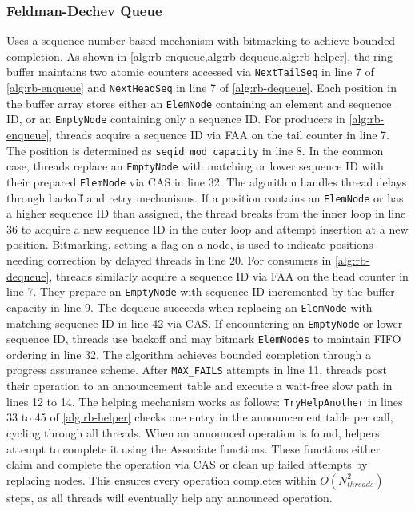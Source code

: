 \subsubsection{Feldman-Dechev Queue} 
Uses a sequence number-based mechanism with bitmarking to achieve bounded completion. As shown in \cref{alg:rb-enqueue,alg:rb-dequeue,alg:rb-helper}, the ring buffer maintains two atomic counters accessed via \texttt{NextTailSeq} in line 7 of \cref{alg:rb-enqueue} and \texttt{NextHeadSeq} in line 7 of \cref{alg:rb-dequeue}. Each position in the buffer array stores either an \texttt{ElemNode} containing an element and sequence ID, or an \texttt{EmptyNode} containing only a sequence ID. For producers in \cref{alg:rb-enqueue}, threads acquire a sequence ID via \ac{FAA} on the tail counter in line 7. The position is determined as \texttt{seqid mod capacity} in line 8. In the common case, threads replace an \texttt{EmptyNode} with matching or lower sequence ID with their prepared \texttt{ElemNode} via \ac{CAS} in line 32. The algorithm handles thread delays through backoff and retry mechanisms. If a position contains an \texttt{ElemNode} or has a higher sequence ID than assigned, the thread breaks from the inner loop in line 36 to acquire a new sequence ID in the outer loop and attempt insertion at a new position. Bitmarking, setting a flag on a node, is used to indicate positions needing correction by delayed threads in line 20. For consumers in \cref{alg:rb-dequeue}, threads similarly acquire a sequence ID via \ac{FAA} on the head counter in line 7. They prepare an \texttt{EmptyNode} with sequence ID incremented by the buffer capacity in line 9. The dequeue succeeds when replacing an \texttt{ElemNode} with matching sequence ID in line 42 via \ac{CAS}. If encountering an \texttt{EmptyNode} or lower sequence ID, threads use backoff and may bitmark \texttt{ElemNodes} to maintain FIFO ordering in line 32. The algorithm achieves bounded completion through a progress assurance scheme. After \texttt{MAX\_FAILS} attempts in line 11, threads post their operation to an announcement table and execute a wait-free slow path in lines 12 to 14. The helping mechanism works as follows: \texttt{TryHelpAnother} in lines 33 to 45 of \cref{alg:rb-helper} checks one entry in the announcement table per call, cycling through all threads. When an announced operation is found, helpers attempt to complete it using the Associate functions. These functions either claim and complete the operation via \ac{CAS} or clean up failed attempts by replacing nodes. This ensures every operation completes within $O(N_{threads}^2)$ steps, as all threads will eventually help any announced operation. \cite{FeldmanDechevV2}

